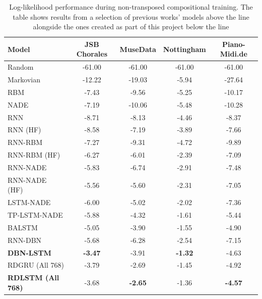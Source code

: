 \documentclass[12pt,]{article}
\begin{document}
\begin{table}[H]
\centering
\caption{Log-likelihood performance during non-transposed compositional training. The table shows results from a selection of previous works’ models above the line alongside the ones created as part of this project below the line}
\vspace{1em}
\begin{tabular}{lcccc} 
\toprule
\textbf{Model}    & \textbf{JSB Chorales} & \textbf{MuseData} & \textbf{Nottingham} & \textbf{Piano-Midi.de}  \\ 
\midrule
Random            & -61.00                & -61.00            & -61.00              & -61.00                  \\
Markovian         & -12.22                & -19.03            & -5.94               & -27.64                  \\
RBM               & -7.43                 & -9.56             & -5.25               & -10.17                  \\
NADE              & -7.19                 & -10.06            & -5.48               & -10.28                  \\
RNN               & -8.71                 & -8.13             & -4.46               & -8.37                   \\
RNN (HF)          & -8.58                 & -7.19             & -3.89               & -7.66                   \\
RNN-RBM           & -7.27                 & -9.31             & -4.72               & -9.89                   \\
RNN-RBM (HF)      & -6.27                 & -6.01             & -2.39               & -7.09                   \\
RNN-NADE          & -5.83                 & -6.74             & -2.91               & -7.48                   \\
RNN-NADE (HF)     & -5.56                 & -5.60             & -2.31               & -7.05                   \\
LSTM-NADE         & -6.00                 & -5.02             & -2.02               & -7.36                   \\
TP-LSTM-NADE      & -5.88                 & -4.32             & -1.61               & -5.44                   \\
BALSTM            & -5.05                 & -3.90             & -1.55               & -4.90                   \\
RNN-DBN           & -5.68                 & -6.28             & -2.54               & -7.15                   \\
\textbf{DBN-LSTM} & \textbf{-3.47}        & -3.91             & \textbf{-1.32}      & -4.63                   \\ 
\midrule
RDGRU (All 768)             & -3.79                 & -2.69             & -1.45               & -4.92                   \\
\textbf{RDLSTM (All 768)}   & -3.68                 & \textbf{-2.65}    & -1.36               & \textbf{-4.57}          \\
\bottomrule
\end{tabular}
\end{table}
\end{document}

